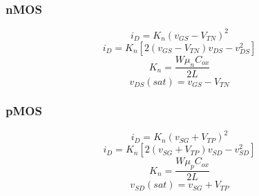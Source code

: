 \documentclass[landscape, 12pt]{report}
\begin{document}
\begin{multicols*}{3}
\subsubsection*{nMOS}
\begin{equation}
    i_D = K_n(v_{GS} - V_{TN})^2
\end{equation}
\begin{equation}
    i_D = K_n[2(v_{GS} - V_{TN})v_{DS}-v_{DS}^2]
\end{equation}
\begin{equation}
    K_n = \frac{W\mu_n C_{ox}}{2L}
\end{equation}
\begin{equation}
    v_{DS}(sat) = v_{GS} - V_{TN}
\end{equation}
\subsubsection*{pMOS}
\begin{equation}
    i_D = K_n(v_{SG} + V_{TP})^2
\end{equation}
\begin{equation}
    i_D = K_n[2(v_{SG} + V_{TP})v_{SD}-v_{SD}^2]
\end{equation}
\begin{equation}
    K_n = \frac{W\mu_p C_{ox}}{2L}
\end{equation}
\begin{equation}
    v_{SD}(sat) = v_{SG} + V_{TP}
\end{equation}

\end{multicols*}
\end{document}
